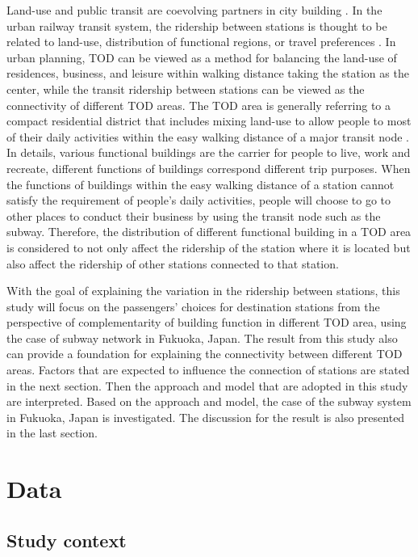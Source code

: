 \documentclass[utf8]{article}
\begin{document}
%
Land-use and public transit are coevolving partners in city building \cite{Handy2005,Dittmar2012}. In the urban railway transit system, the ridership between stations is thought to be related to land-use, distribution of functional regions, or travel preferences \cite{Thompson1997}. In urban planning, TOD can be viewed as a method for balancing the land-use of residences, business, and leisure within walking distance taking the station as the center, while the transit ridership between stations can be viewed as the connectivity of different TOD areas. The TOD area is generally referring to a compact residential district that includes mixing land-use to allow people to most of their daily activities within the easy walking distance of a major transit node \cite{Lund2004}. In details, various functional buildings are the carrier for people to live, work and recreate, different functions of buildings correspond different trip purposes. When the functions of buildings within the easy walking distance of a station cannot satisfy the requirement of people’s daily activities, people will choose to go to other places to conduct their business by using the transit node such as the subway. Therefore, the distribution of different functional building in a TOD area is considered to not only affect the ridership of the station where it is located but also affect the ridership of other stations connected to that station.

%
With the goal of explaining the variation in the ridership between stations, this study will focus on the passengers’ choices for destination stations from the perspective of complementarity of building function in different TOD area, using the case of subway network in Fukuoka, Japan. The result from this study also can provide a foundation for explaining the connectivity between different TOD areas. Factors that are expected to influence the connection of stations are stated in the next section. Then the approach and model that are adopted in this study are interpreted. Based on the approach and model, the case of the subway system in Fukuoka, Japan is investigated. The discussion for the result is also presented in the last section.

%
\section{Data}

%
\subsection{Study context}
\indent
\end{document}
